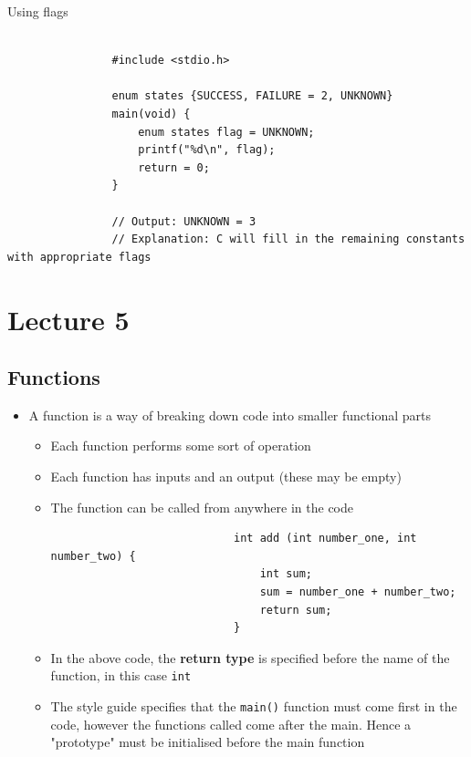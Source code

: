 \documentclass{article}
\begin{document}
		\begin{question}{Using flags}
			\begin{verbatim}
				
				#include <stdio.h>

				enum states {SUCCESS, FAILURE = 2, UNKNOWN}
				main(void) {
					enum states flag = UNKNOWN;
					printf("%d\n", flag);
					return = 0;
				}

				// Output: UNKNOWN = 3
				// Explanation: C will fill in the remaining constants with appropriate flags

			\end{verbatim}
			
		\end{question}

\newpage

\section{Lecture 5}

	\subsection{Functions}
		
		\begin{itemize}
			\item A function is a way of breaking down code into smaller functional parts
				\begin{itemize}
					\item Each function performs some sort of operation
					\item Each function has inputs and an output (these may be empty)
					\item The function can be called from anywhere in the code
						\begin{verbatim}
							int add (int number_one, int number_two) {
								int sum;
								sum = number_one + number_two;
								return sum;
							}
						\end{verbatim}
					\item In the above code, the \textbf{return type} is specified before the name of the function, in this case \texttt{int}
					\item The style guide specifies that the \texttt{main()} function must come first in the code, however the functions called come after the main. Hence a "prototype" must be initialised before the main function
				\end{itemize}
		\end{itemize}
\end{document}
